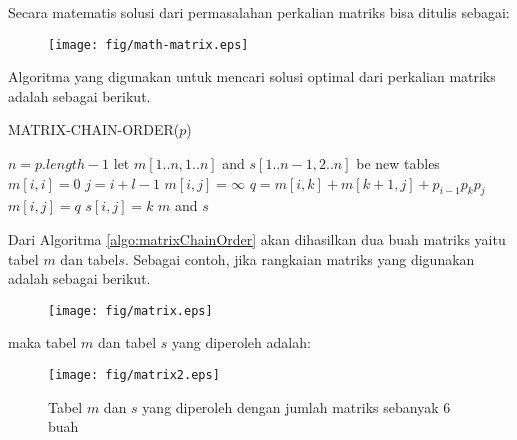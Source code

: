 Secara matematis solusi dari permasalahan perkalian matriks bisa ditulis sebagai:

\begin{figure}
	\texttt{[image: fig/math-matrix.eps]}%
	\label{fig:math-matrix}%
\end{figure}

Algoritma yang digunakan untuk mencari solusi optimal dari perkalian matriks adalah sebagai berikut.

\begin{algorithm}
	\caption{MATRIX-CHAIN-ORDER($p$)}
	\label{algo:matrixChainOrder}
	\begin{algorithmic}[1]
		\STATE $n=p.length-1$
		\STATE let $m[1..n,1..n]$ and $s[1..n-1,2..n]$ be new tables
			\STATE $m[i,i] = 0$
		\ENDFOR
				\STATE $j=i+l-1$
				\STATE $m[i,j]=\infty$
					\STATE $q=m[i,k]+m[k+1,j]+p_{i-1}p_{k}p_{j}$
						\STATE $m[i,j]=q$
						\STATE $s[i,j]=k$
					\ENDIF			
				\ENDFOR
			\ENDFOR
		\ENDFOR
		\RETURN $m$ and $s$
	\end{algorithmic}
\end{algorithm}

Dari Algoritma \ref{algo:matrixChainOrder} akan dihasilkan dua buah matriks yaitu tabel $m$ dan tabel$s$. Sebagai contoh, jika rangkaian matriks yang digunakan adalah sebagai berikut.

\begin{figure}
	\texttt{[image: fig/matrix.eps]}%
	\label{fig:matrix}%
\end{figure}

maka tabel $m$ dan tabel $s$ yang diperoleh adalah:
\begin{figure}
	\texttt{[image: fig/matrix2.eps]}%
	\caption{Tabel $m$ dan $s$ yang diperoleh dengan jumlah matriks sebanyak 6 buah}
	\label{fig:matrix2}%
\end{figure}

